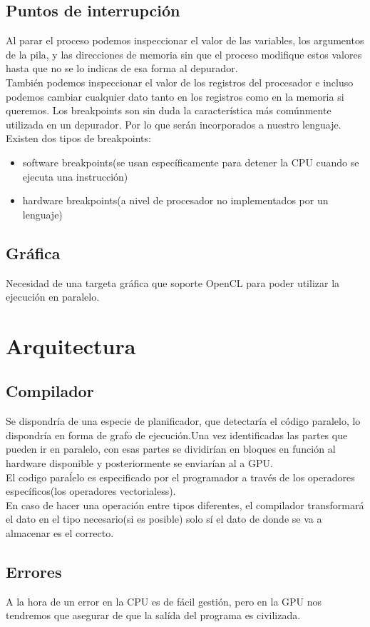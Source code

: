 \documentclass[12pt,a4paper]{article}
\begin{document}
\subsection{Puntos de interrupción}
Al parar el proceso podemos inspeccionar el valor de las variables, los argumentos de la pila, y las direcciones de memoria sin que el proceso modifique estos valores hasta que no se lo indicas de esa forma al depurador.\\
También podemos inspeccionar el valor de los registros del procesador e incluso podemos cambiar cualquier dato tanto en los registros como en la memoria si queremos. Los breakpoints son sin duda la característica más comúnmente utilizada en un depurador. Por lo que serán incorporados a nuestro lenguaje.
\\ Existen dos tipos de breakpoints:
\begin{itemize}
\item software breakpoints(se usan específicamente para detener la CPU cuando se ejecuta una instrucción)
\item hardware breakpoints(a nivel de procesador no implementados por un lenguaje)
\end{itemize}
\subsection{Gráfica}
Necesidad de una targeta gráfica que soporte OpenCL para poder utilizar la
ejecución en paralelo.
\section{Arquitectura}
\subsection{Compilador}
Se dispondría de una especie de planificador, que detectaría el código paralelo,
lo dispondría en forma de grafo de ejecución.Una vez identificadas las partes
que pueden ir en paralelo, con esas partes se dividirían en bloques en función
al hardware disponible y posteriormente se enviarían al a GPU.\\
El codigo paraĺelo es especificado por el programador a través de los operadores
específicos(los operadores vectorialess).\\
En caso de hacer una operación entre tipos diferentes, el compilador
transformará el dato en el tipo necesario(si es posible) solo sí el dato de
donde se va a almacenar es el correcto.
\subsection{Errores}
A la hora de un error en la CPU es de fácil gestión, pero en la GPU nos
tendremos que asegurar de que la salída del programa es civilizada.
\end{document}
